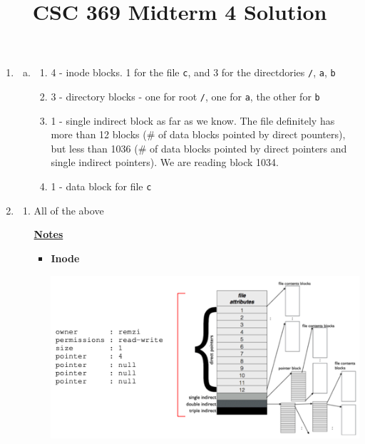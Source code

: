 \documentclass[12pt]{article}
\begin{document}
\title{CSC 369 Midterm 4 Solution}

\bigskip

\begin{enumerate}[1.]
    \item

    \begin{enumerate}[a)]

        \item
        \begin{enumerate}[1)]
            \item 4 - inode blocks. 1 for the file \texttt{c}, and 3 for the
            directdories \texttt{/}, \texttt{a}, \texttt{b}

            \item 3 - directory blocks - one for root \texttt{/}, one for \texttt{a},
            the other for \texttt{b}

            \item 1 - single indirect block as far as we know. The file definitely has more than
            12 blocks (\# of data blocks pointed by direct pounters), but less than 1036 (\# of data blocks pointed
            by direct pointers and single indirect pointers). We are reading block 1034.

            \item 1 - data block for file \texttt{c}
        \end{enumerate}
    \end{enumerate}

    \item

    \begin{enumerate}
        \item

        All of the above

        \bigskip

        \underline{\textbf{Notes}}

        \begin{itemize}
            \item \textbf{Inode}

            \begin{center}
            \includegraphics[width=0.8\linewidth]{../images/midterm_4_solution_1.png}
            \end{center}


\end{itemize}
\end{enumerate}
\end{enumerate}
\end{document}
